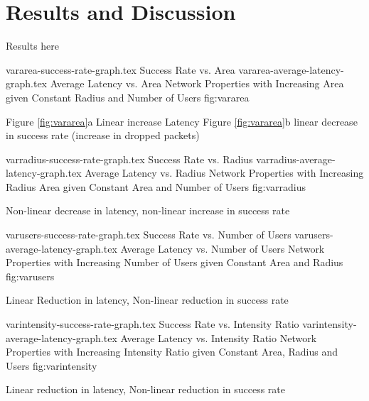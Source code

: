 \section{Results and Discussion}
Results here

\sidebysidefigures
{vararea-success-rate-graph.tex}       {Success Rate vs. Area}
{vararea-average-latency-graph.tex}    {Average Latency vs. Area}
{Network Properties with Increasing Area given Constant Radius and Number of Users}
{fig:vararea}

Figure \ref{fig:vararea}a Linear increase Latency
Figure \ref{fig:vararea}b linear decrease in success rate (increase in dropped packets)

\sidebysidefigures
{varradius-success-rate-graph.tex}     {Success Rate vs. Radius}
{varradius-average-latency-graph.tex}  {Average Latency vs. Radius}
{Network Properties with Increasing Radius Area given Constant Area and Number of Users}
{fig:varradius}

Non-linear decrease in latency, non-linear increase in success rate

\sidebysidefigures
{varusers-success-rate-graph.tex}      {Success Rate vs. Number of Users}
{varusers-average-latency-graph.tex}   {Average Latency vs. Number of Users}
{Network Properties with Increasing Number of Users given Constant Area and Radius}
{fig:varusers}

Linear Reduction in latency, Non-linear reduction in success rate

\sidebysidefigures
{varintensity-success-rate-graph.tex}      {Success Rate vs. Intensity Ratio}
{varintensity-average-latency-graph.tex}   {Average Latency vs. Intensity Ratio}
{Network Properties with Increasing Intensity Ratio given Constant Area, Radius and Users}
{fig:varintensity}

Linear reduction in latency, Non-linear reduction in success rate
